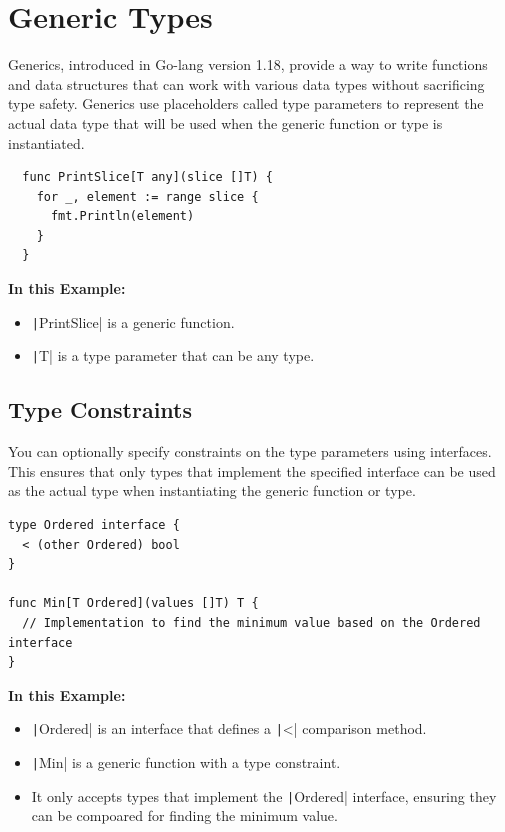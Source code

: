 \documentclass[letterpaper,12pt]{article}
\begin{document}
\section{Generic Types}
Generics, introduced in Go-lang version 1.18, provide a way to write functions and data structures that can work with various data types without sacrificing type safety. Generics use placeholders called type parameters to represent the actual data type that will be used when the generic function or type is instantiated.
\begin{verbatim}
  func PrintSlice[T any](slice []T) {
    for _, element := range slice {
      fmt.Println(element)
    }
  }
\end{verbatim}
\textbf{In this Example:}
\begin{itemize}
  \item \texttt|PrintSlice| is a generic function.
  \item \texttt|T| is a type parameter that can be any type.
\end{itemize}

\newpage

\subsection{Type Constraints}
You can optionally specify constraints on the type parameters using interfaces. This ensures that only types that implement the specified interface can be used as the actual type when instantiating the generic function or
type.
\begin{verbatim}
type Ordered interface {
  < (other Ordered) bool
}

func Min[T Ordered](values []T) T {
  // Implementation to find the minimum value based on the Ordered interface
}
\end{verbatim}
\textbf{In this Example:}
\begin{itemize}
  \item \texttt|Ordered| is an interface that defines a \texttt|<| comparison method.
  \item \texttt|Min| is a generic function with a type constraint.
  \item It only accepts types that implement the \texttt|Ordered| interface, ensuring they can be compoared for finding the minimum value.
\end{itemize}
\end{document}

